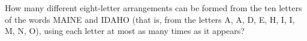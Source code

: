 How many different eight-letter arrangements can be formed from the ten letters of the words MAINE and IDAHO (that is, from the letters A, A, D, E, H, I, I, M, N, O), using each letter at most as many times as it appears?
